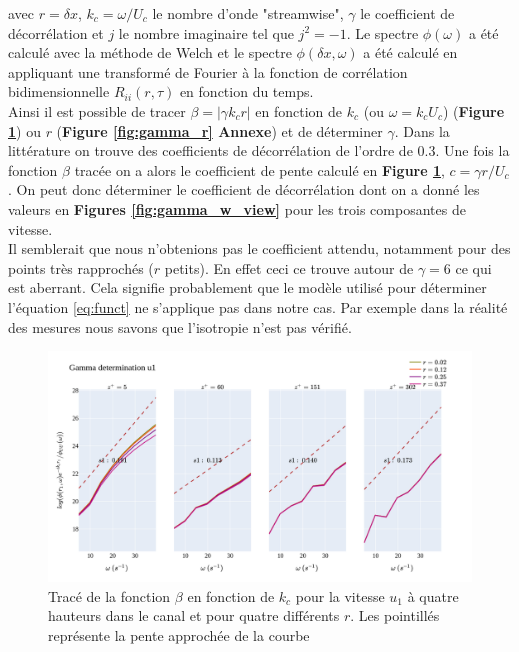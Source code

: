 \documentclass[12pt]{article}   %
\theoremstyle{plain}
\theoremstyle{remark}
\begin{document}
avec $r = \delta x$, $k_c=\omega/U_c$ le nombre d'onde "streamwise", $\gamma$ le coefficient de décorrélation et $j$ le nombre imaginaire tel que $j^2=-1$. Le spectre $\phi(\omega)$ a été calculé avec la méthode de Welch et le spectre $\phi(\delta x, \omega)$ a été calculé en appliquant une transformé de Fourier à la fonction de corrélation bidimensionnelle $R_{ii}(r,\tau)$ en fonction du temps.\\
Ainsi il est possible de tracer $\beta = |\gamma k_c r|$ en fonction de $k_c$ (ou $\omega=k_c U_c$) ({\bf Figure \ref{fig:gamma_w}}) ou $r$ ({\bf Figure \ref{fig:gamma_r} Annexe}) et de déterminer $\gamma$. Dans la littérature on trouve des coefficients de décorrélation de l'ordre de $0.3$. Une fois la fonction $\beta$ tracée on a alors le coefficient de pente calculé en {\bf Figure \ref{fig:gamma_w}}, $c=\gamma r / U_c$. On peut donc déterminer le coefficient de décorrélation dont on a donné les valeurs en {\bf Figures \ref{fig:gamma_w_view}} pour les trois composantes de vitesse. \\
Il semblerait que nous n'obtenions pas le coefficient attendu, notamment pour des points très rapprochés ($r$ petits). En effet ceci ce trouve autour de $\gamma = 6$ ce qui est aberrant. Cela signifie probablement que le modèle utilisé pour déterminer l'équation \ref{eq:funct} ne s'applique pas dans notre cas. Par exemple dans la réalité des mesures nous savons que l'isotropie n'est pas vérifié.



\begin{figure}[H]
	\begin{center}
		\includegraphics[width=0.9\linewidth]{../../output/figures/channel_wrles_retau395/split_time/gamma/gamma_u1_w.png}
		\caption{Tracé de la fonction $\beta$ en fonction de $k_c$ pour la vitesse $u_1$ à quatre hauteurs dans le canal et pour quatre différents $r$. Les pointillés représente la pente approchée de la courbe}
		\label{fig:gamma_w}
	\end{center}
\end{figure}
\end{document}
